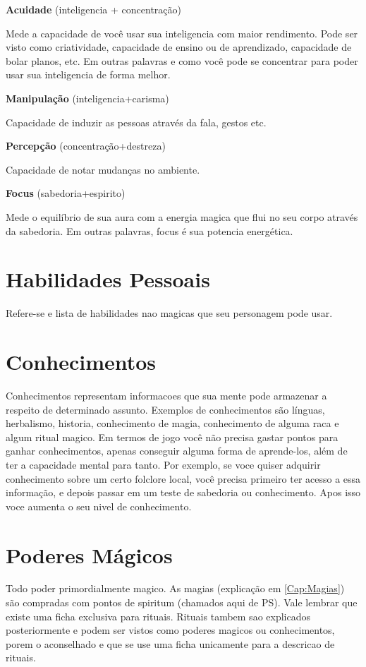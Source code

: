 \textbf{Acuidade} (inteligencia + concentração)

Mede a capacidade de você usar sua inteligencia com maior rendimento. Pode ser visto como criatividade, capacidade de ensino ou de aprendizado, capacidade de bolar planos, etc. Em outras palavras e como você pode se concentrar para poder usar sua inteligencia de forma melhor.

\textbf{Manipulação} (inteligencia+carisma)

Capacidade de induzir as pessoas através da fala, gestos etc. 

\textbf{Percepção} (concentração+destreza)

Capacidade de notar mudanças no ambiente.

\textbf{Focus} (sabedoria+espirito)

Mede o equilíbrio de sua aura com a energia magica que flui no seu corpo através da sabedoria. Em outras palavras, focus é sua potencia energética.

\section{Habilidades Pessoais}

Refere-se e lista de habilidades nao magicas que seu personagem pode usar. 


\section{Conhecimentos}

Conhecimentos representam informacoes que sua mente pode armazenar a respeito de determinado assunto. Exemplos de conhecimentos são línguas, herbalismo, historia, conhecimento de magia, conhecimento de alguma raca e algum ritual magico. Em termos de jogo você não precisa gastar pontos para ganhar conhecimentos, apenas conseguir alguma forma de aprende-los, além de ter a capacidade mental para tanto. 
Por exemplo, se voce quiser adquirir conhecimento sobre um certo folclore local, você precisa primeiro ter acesso a essa informação, e depois passar em um teste de sabedoria ou conhecimento. Apos isso voce aumenta o seu nivel de conhecimento.

\section{Poderes Mágicos}

Todo poder primordialmente magico. As magias (explicação em \ref{Cap:Magias}) são compradas com pontos de spiritum (chamados aqui de PS). Vale lembrar que existe uma ficha exclusiva para rituais. Rituais tambem sao explicados posteriormente e podem ser vistos como poderes magicos ou conhecimentos, porem o aconselhado e que se use uma ficha unicamente para a descricao de rituais.


